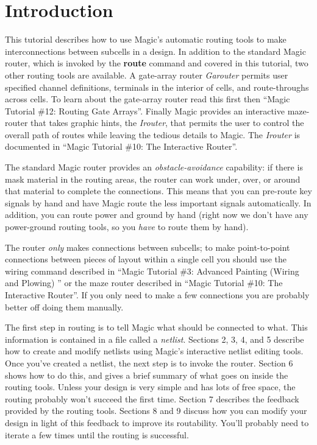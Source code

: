 \documentclass[letterpaper,twoside,12pt]{article}
\begin{document}
\vspace*{0.75in}
\section{Introduction}

This tutorial describes how to use Magic's automatic routing
tools to make interconnections between subcells in a design.  In
addition to the standard Magic router, which is invoked by the {\bfseries route}
command and covered in this tutorial, two
other routing tools are available.  A gate-array router {\itshape Garouter}
permits user specified channel definitions, terminals in the interior
of cells, and route-throughs across cells.  To learn about the gate-array
router read this first then
``Magic Tutorial \#12:  Routing Gate Arrays''.  Finally Magic
provides an interactive maze-router that takes graphic hints, the 
{\itshape Irouter}, that
permits the user to control the overall path of routes while leaving
the tedious details to Magic.  The {\itshape Irouter} is documented in 
``Magic Tutorial \#10:  The Interactive Router''.

The standard Magic router provides an {\itshape obstacle-avoidance}
capability:  if there is mask material in
the routing areas, the router can work under, over, or
around that material to complete the connections.  This means
that you can pre-route key signals by hand and have Magic
route the less important signals automatically.  In addition,
you can route power and ground by hand (right now we don't have
any power-ground routing tools, so you {\itshape have}
to route them by hand).

The router {\itshape only} makes connections between
subcells; to make point-to-point connections between pieces of layout within
a single cell you should use the wiring command described
in ``Magic Tutorial \#3: Advanced Painting (Wiring and Plowing) '' or
the maze router described in ``Magic Tutorial \#10:  The Interactive Router''.
If you only need to make a few connections you are probably better off doing
them manually.

The first step in routing is to tell Magic what should be connected
to what.  This information is contained in a file called a {\itshape netlist}.
Sections 2, 3, 4, and 5 describe how to create and modify netlists using
Magic's interactive netlist editing tools.
Once you've created a netlist, the next step is to invoke the
router.  Section 6 shows how to do this, and gives a brief summary
of what goes on inside the routing tools.  Unless your design is
very simple and has lots of free space, the routing probably won't
succeed the first time.  Section 7 describes the feedback provided
by the routing tools.  Sections 8 and 9 discuss how you can modify your design
in light of this feedback to improve its routability.
You'll probably need to iterate a few times until the routing is successful.
\end{document}

